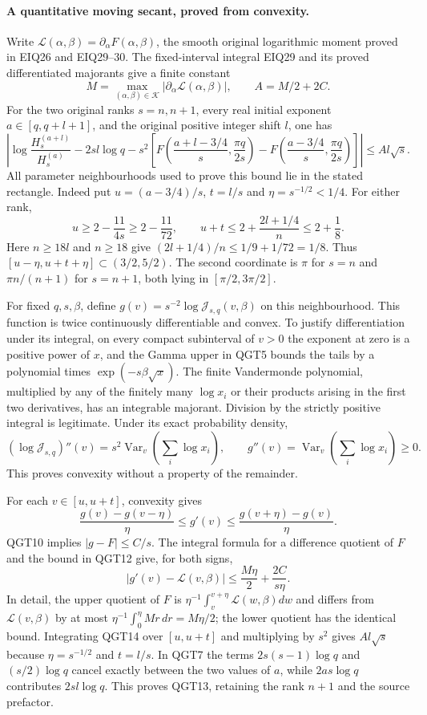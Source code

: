 \documentclass[11pt,a4paper]{article}
\begin{document}
\paragraph{A quantitative moving secant, proved from convexity.}
Write $\mathcal L(\alpha,\beta)=\partial_\alpha F(\alpha,\beta)$,
the smooth original logarithmic moment proved in EIQ26 and EIQ29--30.
The fixed-interval integral EIQ29 and its proved differentiated
majorants give a finite constant
\[
 M=\max_{(\alpha,\beta)\in\mathcal K}
                   |\partial_\alpha\mathcal L(\alpha,\beta)|,
 \qquad A=M/2+2C.
 \tag{QGT12}
\]
For the two original ranks $s=n,n+1$, every real initial exponent
$a\in[q,q+l+1]$, and the original positive integer shift $l$, one has
\[
 \boxed{\left|\log\frac{H_s^{(a+l)}}{H_s^{(a)}}-2sl\log q
 -s^2\left[F\left(\frac{a+l-3/4}{s},\frac{\pi q}{2s}\right)
           -F\left(\frac{a-3/4}{s},\frac{\pi q}{2s}\right)\right]
                         \right|\le A l\sqrt s.}
 \tag{QGT13}
\]
All parameter neighbourhoods used to prove this bound lie in the
stated rectangle. Indeed put $u=(a-3/4)/s$, $t=l/s$ and
$\eta=s^{-1/2}<1/4$. For either rank,
\[
 u\ge2-\frac{11}{4s}\ge2-\frac{11}{72},\qquad
 u+t\le2+\frac{2l+1/4}{n}\le2+\frac18.
\]
Here $n\ge18l$ and $n\ge18$ give
$(2l+1/4)/n\le1/9+1/72=1/8$. Thus
$[u-\eta,u+t+\eta]\subset(3/2,5/2)$.
The second coordinate is $\pi$ for $s=n$ and $\pi n/(n+1)$ for
$s=n+1$, both lying in $[\pi/2,3\pi/2]$.

For fixed $q,s,\beta$, define
$g(v)=s^{-2}\log\mathcal J_{s,q}(v,\beta)$ on this neighbourhood.
This function is twice continuously differentiable and convex.
To justify differentiation under its integral, on every compact
subinterval of $v>0$ the exponent at zero is a positive power of
$x$, and the Gamma upper in QGT5 bounds the tails by a polynomial
times $\exp(-s\beta\sqrt x)$. The finite Vandermonde polynomial,
multiplied by any of the finitely many $\log x_i$ or their products
arising in the first two derivatives, has an integrable majorant.
Division by the strictly positive integral is legitimate. Under its
exact probability density,
\[
 (\log\mathcal J_{s,q})''(v)
       =s^2\operatorname{Var}_v\!\left(\sum_i\log x_i\right),
 \qquad g''(v)=\operatorname{Var}_v\!\left(\sum_i\log x_i\right)\ge0.
\]
This proves convexity without a property of the remainder.

For each $v\in[u,u+t]$, convexity gives
\[
 \frac{g(v)-g(v-\eta)}{\eta}\le g'(v)
              \le\frac{g(v+\eta)-g(v)}{\eta}.
\]
QGT10 implies $|g-F|\le C/s$. The integral formula for a difference
quotient of $F$ and the bound in QGT12 give, for both signs,
\[
 |g'(v)-\mathcal L(v,\beta)|
          \le\frac{M\eta}{2}+\frac{2C}{s\eta}.
 \tag{QGT14}
\]
In detail, the upper quotient of $F$ is
$\eta^{-1}\int_v^{v+\eta}\mathcal L(w,\beta)dw$ and differs
from $\mathcal L(v,\beta)$ by at most
$\eta^{-1}\int_0^\eta Mr\,dr=M\eta/2$; the lower quotient
has the identical bound. Integrating QGT14 over $[u,u+t]$ and
multiplying by $s^2$ gives $Al\sqrt s$ because
$\eta=s^{-1/2}$ and $t=l/s$. In QGT7 the terms
$2s(s-1)\log q$ and $(s/2)\log q$ cancel exactly between the
two values of $a$, while $2as\log q$ contributes $2sl\log q$.
This proves QGT13, retaining the rank $n+1$ and the source prefactor.
\end{document}
